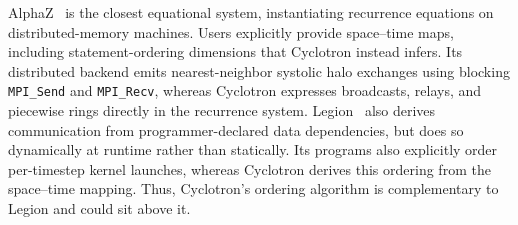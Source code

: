 \documentclass[sigplan, nonacm]{acmart}
\begin{document}

AlphaZ~\citep{alphaz, sanjay-yuki-lcpc2012, sanjay-yuki-TR13-105} is the closest equational system, instantiating recurrence equations on distributed-memory machines. Users explicitly provide space--time maps, including statement-ordering dimensions that Cyclotron instead infers. Its distributed backend emits nearest-neighbor systolic halo exchanges using blocking \texttt{MPI_Send} and \texttt{MPI_Recv}, whereas Cyclotron expresses broadcasts, relays, and piecewise rings directly in the recurrence system. Legion~\citep{legion} also derives communication from programmer-declared data dependencies, but does so dynamically at runtime rather than statically. Its programs also explicitly order per-timestep kernel launches, whereas Cyclotron derives this ordering from the space--time mapping. Thus, Cyclotron's ordering algorithm is complementary to Legion and could sit above it.%
\end{document}
